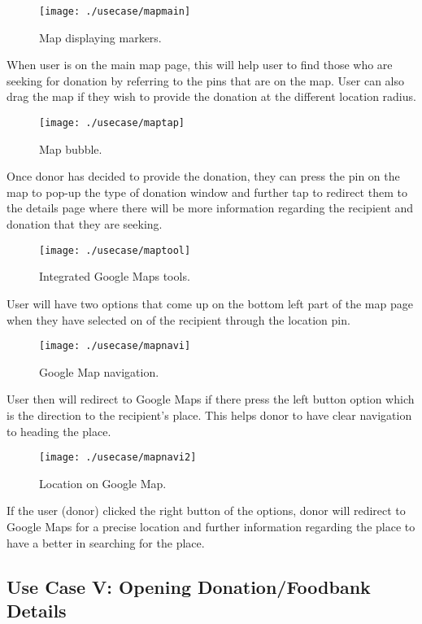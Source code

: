 \documentclass[conference]{IEEEtran}
\begin{document}
\begin{figure}[h!]
\texttt{[image: ./usecase/mapmain]}
\centering
\caption{Map displaying markers.}
\end{figure}
\par When user is on the main map page, this will help user to find those who are seeking for donation by referring to the pins that are on the map. User can also drag the map if they wish to provide the donation at the different location radius. 
\begin{figure}[h!]
\texttt{[image: ./usecase/maptap]}
\centering
\caption{Map bubble.}
\end{figure}
\par Once donor has decided to provide the donation, they can press the pin on the map to pop-up the type of donation window and further tap to redirect them to the details page where there will be more information regarding the recipient and donation that they are seeking.
\begin{figure}[h!]
\texttt{[image: ./usecase/maptool]}
\centering
\caption{Integrated Google Maps tools.}
\end{figure}
\par User will have two options that come up on the bottom left part of the map page when they have selected on of the recipient through the location pin. 
\begin{figure}[h!]
\texttt{[image: ./usecase/mapnavi]}
\centering
\caption{Google Map navigation.}
\end{figure}
\par User then will redirect to Google Maps if there press the left button option which is the direction to the recipient’s place. This helps donor to have clear navigation to heading the place.
\begin{figure}[h!]
\texttt{[image: ./usecase/mapnavi2]}
\centering
\caption{Location on Google Map.}
\end{figure}
\par If the user (donor) clicked the right button of the options,  donor will redirect to Google Maps for a precise location and further information regarding the place to have a better in searching for the place.

\subsection{Use Case V: Opening Donation/Foodbank Details}
\end{document}
